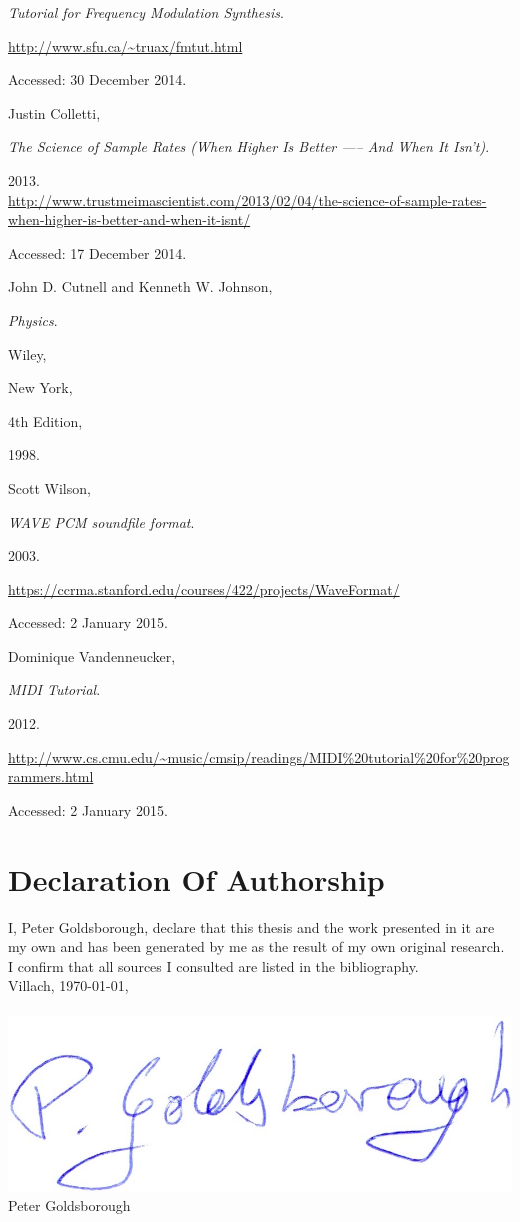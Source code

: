 \documentclass[12pt,twoside]{report}
\begin{document}
\begin{thebibliography}{99}

\emph{Tutorial for Frequency Modulation Synthesis}.

\url{http://www.sfu.ca/~truax/fmtut.html}

Accessed: 30 December 2014.


Justin Colletti,

\emph{The Science of Sample Rates (When Higher Is Better —-- And When It Isn't)}.

2013.\\
  \url{http://www.trustmeimascientist.com/2013/02/04/the-science-of-sample-rates-when-higher-is-better-and-when-it-isnt/}

Accessed: 17 December 2014.


John D. Cutnell and Kenneth W. Johnson,

\emph{Physics}.

Wiley,

New York,

4th Edition,

1998.


Scott Wilson,

\emph{WAVE PCM soundfile format}.

2003.

\url{https://ccrma.stanford.edu/courses/422/projects/WaveFormat/}

Accessed: 2 January 2015.


Dominique Vandenneucker,

\emph{MIDI Tutorial}.

2012.

\url{http://www.cs.cmu.edu/~music/cmsip/readings/MIDI%20tutorial%20for%20programmers.html}

Accessed: 2 January 2015.

\end{thebibliography}

\listoffigures

\chapter*{Declaration Of Authorship}

I, Peter Goldsborough, declare that this thesis and the work presented in it are my own and has been generated by me as the result of my own original research. I confirm that all sources I consulted are listed in the bibliography. \\

\noindent Villach, \today, \\ \\

\noindent \includegraphics[scale=0.18]{img/signature} \\

Peter Goldsborough
\end{document}
